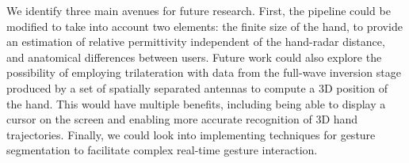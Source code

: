 We identify three main avenues for future research. 
%
First, the pipeline could be modified to take into account two elements: the finite size of the hand, to provide an estimation of relative permittivity independent of the hand-radar distance, and anatomical differences between users.
%
Future work could also explore the possibility of employing trilateration with data from the full-wave inversion stage produced by a set of spatially separated antennas to compute a 3D position of the hand. This would have multiple benefits, including being able to display a cursor on the screen and enabling more accurate recognition of 3D hand trajectories.
%
Finally, we could look into implementing techniques for gesture segmentation to facilitate complex real-time gesture interaction.